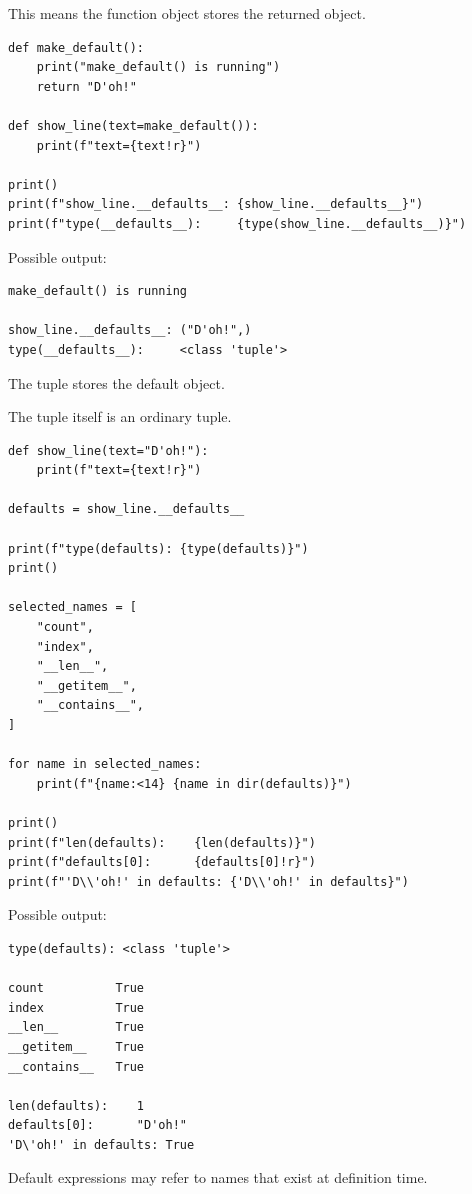 This means the function object stores the returned object.

\begin{verbatim}
def make_default():
    print("make_default() is running")
    return "D'oh!"

def show_line(text=make_default()):
    print(f"text={text!r}")

print()
print(f"show_line.__defaults__: {show_line.__defaults__}")
print(f"type(__defaults__):     {type(show_line.__defaults__)}")
\end{verbatim}

Possible output:

\begin{verbatim}
make_default() is running

show_line.__defaults__: ("D'oh!",)
type(__defaults__):     <class 'tuple'>
\end{verbatim}

The tuple stores the default object.

The tuple itself is an ordinary tuple.

\begin{verbatim}
def show_line(text="D'oh!"):
    print(f"text={text!r}")

defaults = show_line.__defaults__

print(f"type(defaults): {type(defaults)}")
print()

selected_names = [
    "count",
    "index",
    "__len__",
    "__getitem__",
    "__contains__",
]

for name in selected_names:
    print(f"{name:<14} {name in dir(defaults)}")

print()
print(f"len(defaults):    {len(defaults)}")
print(f"defaults[0]:      {defaults[0]!r}")
print(f"'D\\'oh!' in defaults: {'D\\'oh!' in defaults}")
\end{verbatim}

Possible output:

\begin{verbatim}
type(defaults): <class 'tuple'>

count          True
index          True
__len__        True
__getitem__    True
__contains__   True

len(defaults):    1
defaults[0]:      "D'oh!"
'D\'oh!' in defaults: True
\end{verbatim}

Default expressions may refer to names that exist at definition time.

